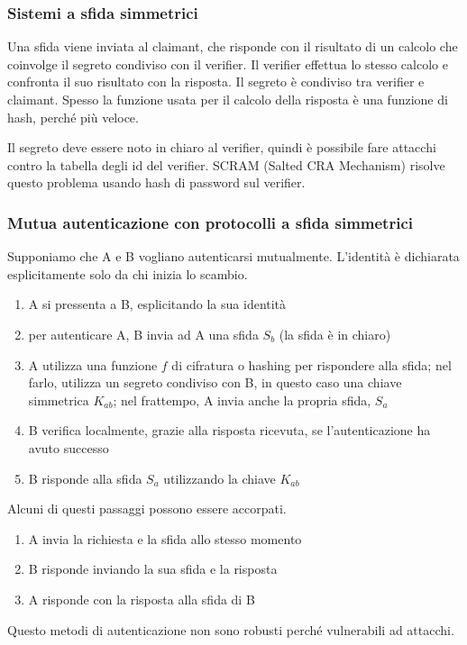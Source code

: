 \documentclass[11pt]{article}
\begin{document}
\subsubsection{Sistemi a sfida simmetrici}
Una sfida viene inviata al claimant, che risponde con il risultato di un calcolo che coinvolge il segreto condiviso con 
il verifier. Il verifier effettua lo stesso calcolo e confronta il suo risultato con la risposta. Il segreto è condiviso 
tra verifier e claimant. Spesso la funzione usata per il calcolo della risposta è una funzione di hash, perché più veloce.


Il segreto deve essere noto in chiaro al verifier, quindi è possibile fare attacchi contro la tabella degli id del verifier.
SCRAM (Salted CRA Mechanism) risolve questo problema usando hash di password sul verifier.
\subsubsection{Mutua autenticazione con protocolli a sfida simmetrici}
Supponiamo che A e B vogliano autenticarsi mutualmente. L'identità è dichiarata esplicitamente solo da chi inizia lo scambio.
\begin{enumerate}
    \item A si pressenta a B, esplicitando la sua identità 
    \item per autenticare A, B invia ad A una sfida $S_b$ (la sfida è in chiaro)
    \item A utilizza una funzione $f$ di cifratura o hashing per rispondere alla sfida; nel farlo, utilizza un segreto 
    condiviso con B, in questo caso una chiave simmetrica $K_{ab}$; nel frattempo, A invia anche la propria sfida, $S_a$
    \item B verifica localmente, grazie alla risposta ricevuta, se l'autenticazione ha avuto successo 
    \item B risponde alla sfida $S_a$ utilizzando la chiave $K_{ab}$
\end{enumerate} 
Alcuni di questi passaggi possono essere accorpati.
\begin{enumerate}
    \item A invia la richiesta e la sfida allo stesso momento 
    \item B risponde inviando la sua sfida e la risposta 
    \item A risponde con la risposta alla sfida di B
\end{enumerate}
Questo metodi di autenticazione non sono robusti perché vulnerabili ad attacchi. 
\end{document}
